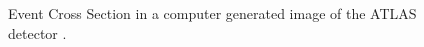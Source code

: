 \begin{figure}
    \centering
    \caption{Event Cross Section in a computer generated image of the
    ATLAS detector \cite{PDetector}.}
    \label{fig:detector}
\end{figure}
